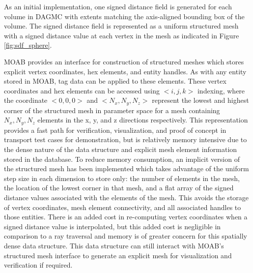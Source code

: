 As an initial implementation, one signed distance field is generated for each
volume in DAGMC with extents matching the axis-aligned bounding box of the
volume. The signed distance field is represented as a uniform structured mesh
with a signed distance value at each vertex in the mesh as indicated in Figure
\ref{fig:sdf_sphere}.

MOAB provides an interface for construction of structured meshes which stores
explicit vertex coordinates, hex elements, and entity handles. As with any
entity stored in MOAB, tag data can be applied to these elements. These vertex
coordinates and hex elements can be accessed using $<i,j,k>$ indexing, where the
coordinate $<0,0,0>$ and $<N_{x}, N_{y}, N_{z}>$ represent the lowest and
highest corner of the structured mesh in parameter space for a mesh containing
$N_{x},N_{y},N_{z}$ elements in the x, y, and z directions respectively. This
representation provides a fast path for verification, visualization, and proof
of concept in transport test cases for demonstration, but is relatively memory
intensive due to the dense nature of the data structure and explicit mesh
element information stored in the database. To reduce  memory consumption,
an implicit version of the structured mesh has been implemented which takes
advantage of the uniform step size in each dimension to store only: the number
of elements in the mesh, the location of the lowest corner in that mesh, and a
flat array of the signed distance values associated with the elements of the
mesh.
This avoids the storage of vertex coordinates, mesh element connectivity, and
all associated handles to those entities. There is an added cost in re-computing
vertex coordinates when a signed distance value is interpolated, but this added
cost is negligible in comparison to a ray traversal and memory is of greater
concern for this spatially dense data structure. This data structure can still
interact with MOAB's structured mesh interface to generate an explicit mesh for
visualization and verification if required.


